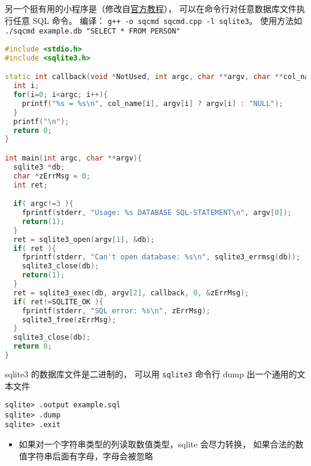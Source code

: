 另一个挺有用的小程序是（修改自\href{https://www.sqlite.org/quickstart.html}{官方教程}）， 可以在命令行对任意数据库文件执行任意 SQL 命令。 编译： \verb`g++ -o sqcmd sqcmd.cpp -l sqlite3`。 使用方法如 \verb`./sqcmd example.db "SELECT * FROM PERSON"`
\begin{lstlisting}[language=cpp]
#include <stdio.h>
#include <sqlite3.h>

static int callback(void *NotUsed, int argc, char **argv, char **col_name){
  int i;
  for(i=0; i<argc; i++){
    printf("%s = %s\n", col_name[i], argv[i] ? argv[i] : "NULL");
  }
  printf("\n");
  return 0;
}

int main(int argc, char **argv){
  sqlite3 *db;
  char *zErrMsg = 0;
  int ret;

  if( argc!=3 ){
    fprintf(stderr, "Usage: %s DATABASE SQL-STATEMENT\n", argv[0]);
    return(1);
  }
  ret = sqlite3_open(argv[1], &db);
  if( ret ){
    fprintf(stderr, "Can't open database: %s\n", sqlite3_errmsg(db));
    sqlite3_close(db);
    return(1);
  }
  ret = sqlite3_exec(db, argv[2], callback, 0, &zErrMsg);
  if( ret!=SQLITE_OK ){
    fprintf(stderr, "SQL error: %s\n", zErrMsg);
    sqlite3_free(zErrMsg);
  }
  sqlite3_close(db);
  return 0;
}
\end{lstlisting}

sqlite3 的数据库文件是二进制的， 可以用 \verb`sqlite3` 命令行 dump 出一个通用的文本文件
\begin{lstlisting}[language=none]
sqlite> .output example.sql
sqlite> .dump
sqlite> .exit
\end{lstlisting}

\begin{itemize}
\item 如果对一个字符串类型的列读取数值类型，sqlite 会尽力转换， 如果合法的数值字符串后面有字母，字母会被忽略
\end{itemize}


